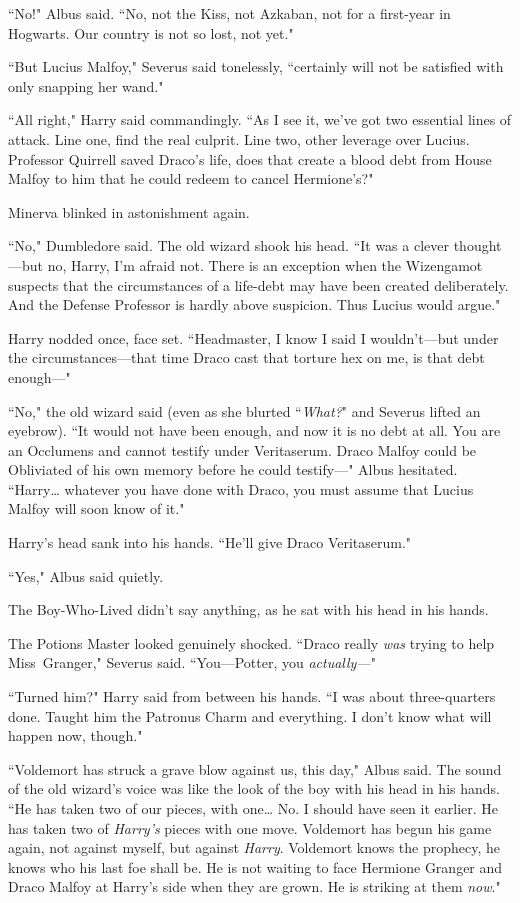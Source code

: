 ``No!" Albus said. ``No, not the Kiss, not Azkaban, not for a first-year in Hogwarts. Our country is not so lost, not yet."

``But Lucius Malfoy," Severus said tonelessly, ``certainly will not be satisfied with only snapping her wand."

``All right," Harry said commandingly. ``As I see it, we've got two essential lines of attack. Line one, find the real culprit. Line two, other leverage over Lucius. Professor Quirrell saved Draco's life, does that create a blood debt from House Malfoy to him that he could redeem to cancel Hermione's?"

Minerva blinked in astonishment again.

``No," Dumbledore said. The old wizard shook his head. ``It was a clever thought—but no, Harry, I'm afraid not. There is an exception when the Wizengamot suspects that the circumstances of a life-debt may have been created deliberately. And the Defense Professor is hardly above suspicion. Thus Lucius would argue."

Harry nodded once, face set. ``Headmaster, I know I said I wouldn't—but under the circumstances—that time Draco cast that torture hex on me, is that debt enough—"

``No," the old wizard said (even as she blurted ``\emph{What?}" and Severus lifted an eyebrow). ``It would not have been enough, and now it is no debt at all. You are an Occlumens and cannot testify under Veritaserum. Draco Malfoy could be Obliviated of his own memory before he could testify—" Albus hesitated. ``Harry{\ldots} whatever you have done with Draco, you must assume that Lucius Malfoy will soon know of it."

Harry's head sank into his hands. ``He'll give Draco Veritaserum."

``Yes," Albus said quietly.

The Boy-Who-Lived didn't say anything, as he sat with his head in his hands.

The Potions Master looked genuinely shocked. ``Draco really \emph{was} trying to help Miss~Granger," Severus said. ``You—Potter, you \emph{actually—}"

``Turned him?" Harry said from between his hands. ``I was about three-quarters done. Taught him the Patronus Charm and everything. I don't know what will happen now, though."

``Voldemort has struck a grave blow against us, this day," Albus said. The sound of the old wizard's voice was like the look of the boy with his head in his hands. ``He has taken two of our pieces, with one{\ldots} No. I should have seen it earlier. He has taken two of \emph{Harry's} pieces with one move. Voldemort has begun his game again, not against myself, but against \emph{Harry}. Voldemort knows the prophecy, he knows who his last foe shall be. He is not waiting to face Hermione Granger and Draco Malfoy at Harry's side when they are grown. He is striking at them \emph{now}."

